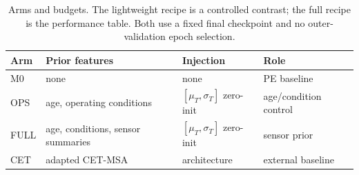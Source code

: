 \begin{table}[t]
\centering
\small
\caption{Arms and budgets. The lightweight recipe is a controlled contrast; the full recipe is the performance table. Both use a fixed final checkpoint and no outer-validation epoch selection.}
\label{tab:arms}
\begin{tabular}{llll}
\toprule
Arm & Prior features & Injection & Role \\
\midrule
M0 & none & none & PE baseline \\
OPS & age, operating conditions & $[\mu_T,\sigma_T]$ zero-init & age/condition control \\
FULL & age, conditions, sensor summaries & $[\mu_T,\sigma_T]$ zero-init & sensor prior \\
CET & adapted CET-MSA & architecture & external baseline \\
\bottomrule
\end{tabular}
\end{table}
